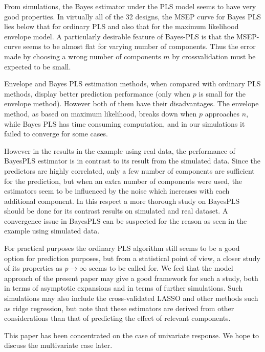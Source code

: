 \documentclass[num-refs]{wiley-article}
\begin{document}
From simulations, the Bayes estimator under the PLS model seems to have very good properties. In virtually all of the 32 designs, the MSEP curve for Bayes PLS lies below that for ordinary PLS and also that for the maximum likelihood envelope model. A particularly desirable feature of Bayes-PLS is that the MSEP-curve seems to be almost flat for varying number of components. Thus the error made by choosing a wrong number of components $m$ by crossvalidation must be expected to be small.

Envelope and Bayes PLS estimation methods, when compared with ordinary PLS methods, display better prediction performance (only when $p$ is small for the envelope method). However both of them have their disadvantages. The envelope method, as based on maximum likelihood, breaks down when $p$ approaches $n$, while Bayes PLS has time consuming computation, and in our simulations it failed to converge for some cases.

However in the results in the example using real data, the performance of BayesPLS estimator is in contrast to its result from the simulated data. Since the predictors are highly correlated, only a few number of components are sufficient for the prediction, but when an extra number of components were used, the estimators seem to be influenced by the noise which increases with each additional component. In this respect a more thorough study on BayesPLS should be done for its contrast results on simulated and real dataset. A convergence issue in BayesPLS can be suspected for
the reason as seen in the example using simulated data.

For practical purposes the ordinary PLS algorithm still seems to be a good option for prediction purposes, but from a statistical point of view, a closer study of its properties as $p\rightarrow\infty$ seems to be called for. We feel that the model approach of the present paper may give a good framework for such a study, both in terms of asymptotic expansions and in terms of further simulations. Such simulations may also include the cross-validated LASSO and other methods such as ridge regression, but note that these estimators are derived from other considerations than that of predicting the effect of relevant components.

This paper has been concentrated on the case of univariate response. We hope to discuss the multivariate case later.



\end{document}
